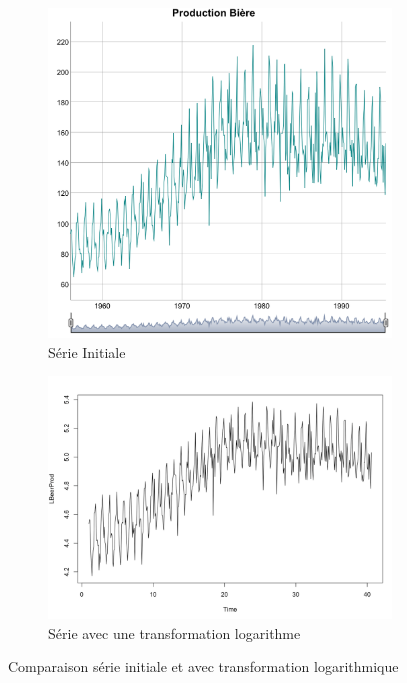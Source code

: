 \documentclass[12pt,a4paper]{book}
\newcommand{\1}{\mathds{1}}
\begin{document}
\begin{figure}[h]
	\begin{subfigure}{.5\textwidth}
  		\centering
    	\includegraphics[scale=0.4]{plot_beer}  
    	\caption{Série Initiale}
    	\label{fig:sub1}
    \end{subfigure}
    \begin{subfigure}{.5\textwidth}
    	\centering
    	\includegraphics[scale=0.3]{Log_Series}  
    	\caption{Série avec une transformation logarithme}
    	\label{fig:sub2}
    \end{subfigure}

\caption{Comparaison série initiale et avec transformation logarithmique}
\label{fig:1}
   
\end{figure}
\end{document}
